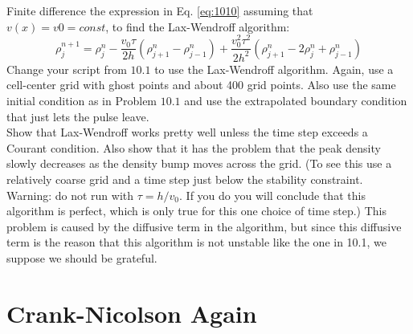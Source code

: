 \begin{problem}\label{P10.2}
 Finite difference the expression in Eq. \eqref{eq:1010} assuming that $v(x) = v0 =
const$, to find the Lax-Wendroff algorithm:
\begin{equation}\label{eq:1011}
\rho_{j}^{n+1}=\rho_{j}^{n}-\frac{v_{0} \tau}{2 h}\left(\rho_{j+1}^{n}-\rho_{j-1}^{n}\right)+\frac{v_{0}^{2} \tau^{2}}{2 h^{2}}\left(\rho_{j+1}^{n}-2 \rho_{j}^{n}+\rho_{j-1}^{n}\right)
\end{equation}
Change your script from $10.1$ to use the Lax-Wendroff algorithm. Again, use a cell-center grid with ghost points and about 400 grid points. Also use the same initial condition as in Problem $10.1$ and use the extrapolated boundary condition that just lets the pulse leave.\\
Show that Lax-Wendroff works pretty well unless the time step exceeds a Courant condition. Also show that it has the problem that the peak density slowly decreases as the density bump moves across the grid. (To see this use a relatively coarse grid and a time step just below the stability constraint.\\
Warning: do not run with $\tau=h / v_{0}$. If you do you will conclude that this algorithm is perfect, which is only true for this one choice of time step.) This problem is caused by the diffusive term in the algorithm, but since this diffusive term is the reason that this algorithm is not unstable like the one in 10.1, we suppose we should be grateful.
\end{problem}
\section*{Crank-Nicolson Again}

